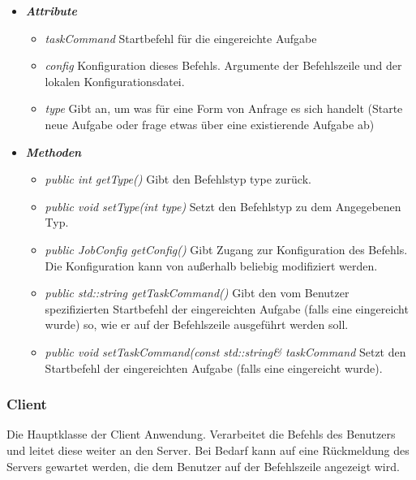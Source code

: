 \documentclass[a4paper,12pt]{article}
\begin{document}
\begin{itemize}[label={}]

	\item \textit{\textbf{Attribute}}
		\begin{itemize}[label={\textbullet}]
			\item \textit{taskCommand} Startbefehl für die eingereichte Aufgabe
			\item \textit{config} Konfiguration dieses Befehls. Argumente der Befehlszeile und der lokalen Konfigurationsdatei.
			\item \textit{type} Gibt an, um was für eine Form von Anfrage es sich handelt (Starte neue Aufgabe oder frage etwas über eine existierende Aufgabe ab)
		\end{itemize}

	\item \textit{\textbf{Methoden}}
		\begin{itemize}[label={\textbullet}]

			\item \textit{public int getType()} Gibt den Befehlstyp type zurück.

			\item \textit{public void setType(int type)} Setzt den Befehlstyp zu dem Angegebenen Typ. 

			\item \textit{public JobConfig getConfig()} Gibt Zugang zur Konfiguration des Befehls. Die Konfiguration kann von außerhalb beliebig modifiziert werden. 

			\item \textit{public std::string getTaskCommand()} Gibt den vom Benutzer spezifizierten Startbefehl der eingereichten Aufgabe (falls eine eingereicht wurde) so, wie er auf der Befehlszeile ausgeführt werden soll.

			\item \textit{public void setTaskCommand(const std::string\& taskCommand} Setzt den Startbefehl der eingereichten Aufgabe (falls eine eingereicht wurde).
		\end{itemize}

\end{itemize}
\clearpage

\subsubsection{Client}

Die Hauptklasse der Client Anwendung. Verarbeitet die Befehls des Benutzers und leitet diese weiter an den Server. Bei Bedarf kann auf eine Rückmeldung des Servers gewartet werden, die dem Benutzer auf der Befehlszeile angezeigt wird.
\end{document}
